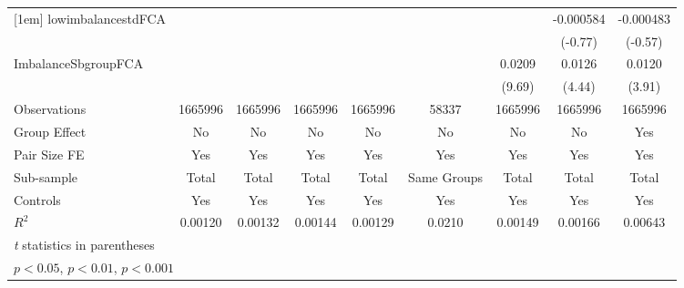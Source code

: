 {\begin{tabular}{l*{8}{c}}
[1em]
lowimbalancestdFCA&                  &                  &                  &                  &                  &                  &-0.000584         &-0.000483         \\
          &                  &                  &                  &                  &                  &                  &  (-0.77)         &  (-0.57)         \\
[1em]
ImbalanceSbgroupFCA&                  &                  &                  &                  &                  &   0.0209\sym{***}&   0.0126\sym{***}&   0.0120\sym{***}\\
          &                  &                  &                  &                  &                  &   (9.69)         &   (4.44)         &   (3.91)         \\
\hline
Observations&  1665996         &  1665996         &  1665996         &  1665996         &    58337         &  1665996         &  1665996         &  1665996         \\
Group Effect&       No         &       No         &       No         &       No         &       No         &       No         &       No         &      Yes         \\
Pair Size FE&      Yes         &      Yes         &      Yes         &      Yes         &      Yes         &      Yes         &      Yes         &      Yes         \\
Sub-sample&    Total         &    Total         &    Total         &    Total         &Same Groups         &    Total         &    Total         &    Total         \\
Controls  &      Yes         &      Yes         &      Yes         &      Yes         &      Yes         &      Yes         &      Yes         &      Yes         \\
$ R^2 $   &  0.00120         &  0.00132         &  0.00144         &  0.00129         &   0.0210         &  0.00149         &  0.00166         &  0.00643         \\
\hline\hline
\multicolumn{9}{l}{\footnotesize \textit{t} statistics in parentheses}\\
\multicolumn{9}{l}{\footnotesize \sym{*} \(p<0.05\), \sym{**} \(p<0.01\), \sym{***} \(p<0.001\)}\\
\end{tabular}
}
